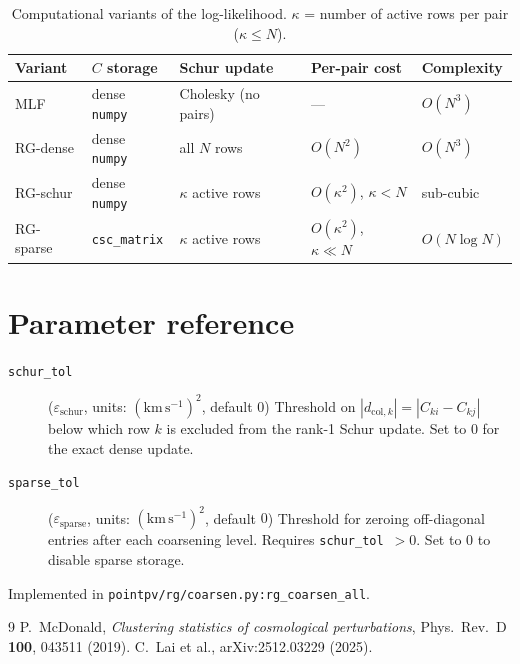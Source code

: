 \documentclass[11pt]{article}
\begin{document}
\begin{table}[h]
\centering
\caption{Computational variants of the log-likelihood.
$\kappa$ = number of active rows per pair ($\kappa \leq N$).}
\label{tab:variants}
\begin{tabular}{lllll}
\toprule
Variant & $C$ storage & Schur update & Per-pair cost & Complexity \\
\midrule
MLF        & dense \texttt{numpy}    & Cholesky (no pairs) & ---          & $O(N^3)$ \\
RG-dense   & dense \texttt{numpy}    & all $N$ rows        & $O(N^2)$     & $O(N^3)$ \\
RG-schur   & dense \texttt{numpy}    & $\kappa$ active rows & $O(\kappa^2)$, $\kappa < N$  & sub-cubic \\
RG-sparse  & \texttt{csc\_matrix}    & $\kappa$ active rows & $O(\kappa^2)$, $\kappa \ll N$ & $O(N\log N)$ \\
\bottomrule
\end{tabular}
\end{table}

\section{Parameter reference}

\begin{description}
  \item[\texttt{schur\_tol}] ($\varepsilon_\mathrm{schur}$, units:
    $(\mathrm{km\,s^{-1}})^2$, default $0$)\quad
    Threshold on $|d_{\mathrm{col},k}| = |C_{ki} - C_{kj}|$ below which
    row $k$ is excluded from the rank-1 Schur update.
    Set to $0$ for the exact dense update.

  \item[\texttt{sparse\_tol}] ($\varepsilon_\mathrm{sparse}$, units:
    $(\mathrm{km\,s^{-1}})^2$, default $0$)\quad
    Threshold for zeroing off-diagonal entries after each coarsening level.
    Requires \texttt{schur\_tol}~$>0$.
    Set to $0$ to disable sparse storage.
\end{description}

\noindent Implemented in \texttt{pointpv/rg/coarsen.py:rg\_coarsen\_all}.

\begin{thebibliography}{9}
  P.~McDonald, \textit{Clustering statistics of cosmological perturbations},
  Phys.\ Rev.\ D \textbf{100}, 043511 (2019).
  C.~Lai et al., arXiv:2512.03229 (2025).
\end{thebibliography}
\end{document}
